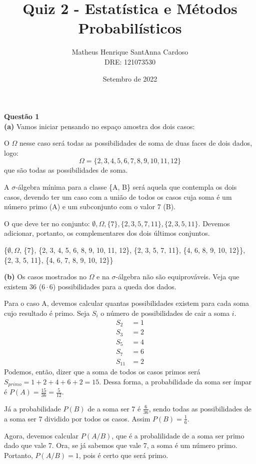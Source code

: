 \documentclass[11pt,a4paper]{article}
\author{
	Matheus Henrique SantAnna Cardoso\\
	DRE: 121073530
}
\title{Quiz 2 - Estatística e Métodos Probabilísticos}
\date{Setembro de 2022}
\begin{document}
\maketitle

{\large{\textbf{Questão 1}}}\\
\textbf{(a)} Vamos iniciar pensando no espaço amostra dos dois casos:

O $\Omega$ nesse caso será todas as possibilidades de soma de duas faces de dois dados, logo:
\[\Omega = \{2, 3, 4, 5, 6, 7, 8, 9, 10, 11, 12\}\]
que são todas as possibilidades de soma.

A $\sigma$-álgebra mínima para a classe \{A, B\} será aquela que contempla os dois casos, devendo ter um caso com a união de todos os casos cuja soma é um número primo (A) e um subconjunto com o valor 7 (B).

O que deve ter no conjunto: $\emptyset, \Omega, \{7\},\{2, 3, 5, 7, 11\}, \{2, 3, 5, 11\}$. Devemos adicionar, portanto, os complementares dos dois últimos conjuntos.

\{$\emptyset, \Omega$, \{7\}, \{2, 3, 4, 5, 6, 8, 9, 10, 11, 12\}, \{2, 3, 5, 7, 11\}, \{4, 6, 8, 9, 10, 12\}\}, \{2, 3, 5, 11\}, \{4, 6, 7, 8, 9, 10, 12\}\}

\vspace{\baselineskip}

\noindent \textbf{(b)} Os casos mostrados no $\Omega$ e na $\sigma$-álgebra não são equiprováveis. Veja que existem 36 ($6 \cdot 6$) possibilidades para a queda dos dados.

Para o caso A, devemos calcular quantas possibilidades existem para cada soma cujo resultado é primo. Seja $S_{i}$ o número de possibilidades de cair a soma $i$.
\begin{align*}
	S_{2}  &= 1\\
	S_{3}  &= 2\\
	S_{5}  &= 4\\
	S_{7}  &= 6\\
	S_{11} &= 2
\end{align*}
Podemos, então, dizer que a soma de todos os casos primos será $S_{primo} = 1 + 2 + 4 + 6 + 2 = 15$.
Dessa forma, a probabilidade da soma ser ímpar é $P(A) = \frac{15}{36} = \frac{5}{12}$.

Já a probabilidade $P(B)$ de a soma ser 7 é $\frac{6}{36}$, sendo todas as possibilidades de a soma ser 7 dividido por todos os casos. Assim $P(B) = \frac{1}{6}$.

Agora, devemos calcular $P(A/B)$, que é a probalilidade de a soma ser primo dado que vale 7. Ora, se já sabemos que vale 7, a soma é um número primo. Portanto, $P(A/B) = 1$, pois é certo que será primo.
\end{document}
